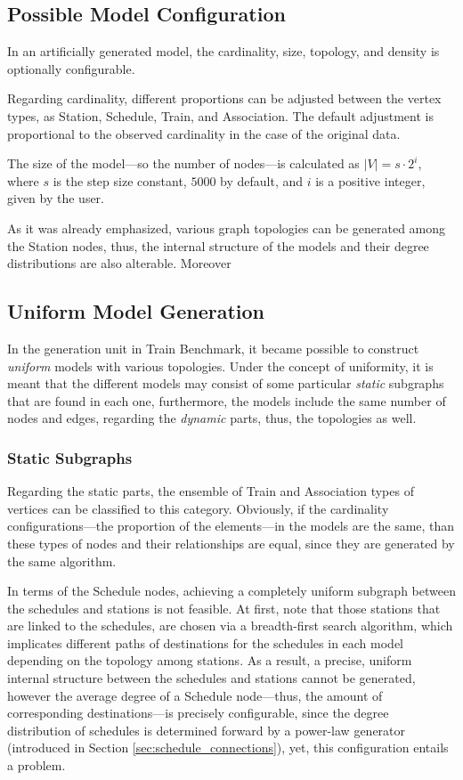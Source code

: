 \subsection{Possible Model Configuration}

In an artificially generated model, the cardinality, size, topology, and density is optionally configurable. 

Regarding cardinality, different proportions can be adjusted between the vertex types, as \textsf{Station}, \textsf{Schedule}, \textsf{Train}, and \textsf{Association}. The default adjustment is proportional to the observed cardinality in the case of the original data.

The size of the model---so the number of nodes---is calculated as $|V| = s \cdot 2^i$, where $s$ is the step size constant, $5000$ by default, and $i$ is a positive integer, given by the user.

As it was already emphasized, various graph topologies can be generated among the \textsf{Station} nodes, thus, the internal structure of the models and their degree distributions are also alterable. Moreover %

\subsection{Uniform Model Generation}

In the generation unit in Train Benchmark, it became possible to construct \textit{uniform} models with various topologies. Under the concept of uniformity, it is meant that the different models may consist of some particular \textit{static} subgraphs that are found in each one, furthermore, the models include the same number of nodes and edges, regarding the \textit{dynamic} parts, thus, the topologies as well.


\subsubsection{Static Subgraphs}
Regarding the static parts, the ensemble of \textsf{Train} and \textsf{Association} types of vertices can be classified to this category. Obviously, if the cardinality configurations---the proportion of the elements---in the models are the same, than these types of nodes and their relationships are equal, since they are generated by the same algorithm.

In terms of the \textsf{Schedule} nodes, achieving a completely uniform subgraph between the schedules and stations is not feasible. At first, note that those stations that are linked to the schedules, are chosen via a breadth-first search algorithm, which implicates different paths of destinations for the schedules in each model depending on the topology among stations. As a result, a precise, uniform internal structure between the schedules and stations cannot be generated, however the average degree of a \textsf{Schedule} node---thus, the amount of corresponding destinations---is precisely configurable, since the degree distribution of schedules is determined forward by a power-law generator (introduced in Section \ref{sec:schedule_connections}), yet, this configuration entails a problem.

